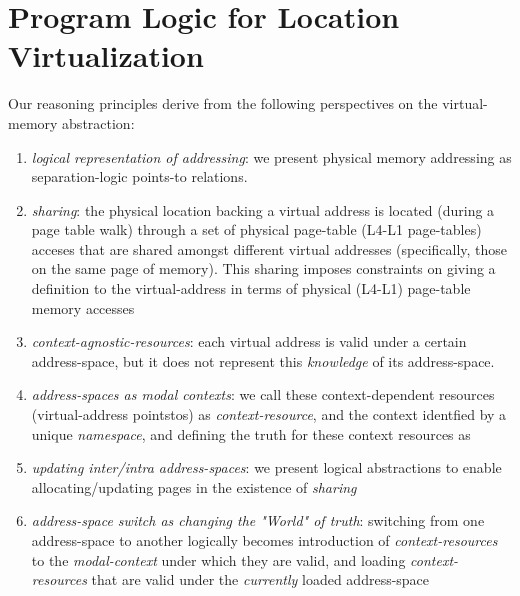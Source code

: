 \section{Program Logic for Location Virtualization}
\label{sec:logic}
\newcommand{\gammaPred}{\delta}
\newcommand{\gammaPreds}{\delta\textsf{s}}
\newcommand{\rtv}{\textsf{rtv}}
\newcommand{\qone}{\texttt{q1}}
\newcommand{\qtwo}{\texttt{q2}}
\newcommand{\qthree}{\texttt{q3}}
\newcommand{\qfour}{\texttt{q4}}

\newcommand{\sumwalkabs}[3]{
  \ownGhost\gammaPred{\authfrag{\singletonMap{#1}{(#2, #3)}}}
}

\newcommand{\sumapaces}[2]{
  \ownGhost\gammaPreds{\authfrag{\singletonMap{#1}{#2}}}
}
\newcommand{\ptableabswalk}[1]{\mathcal{A}\textsf{bsPTableWalk}(#1)}
\newcommand{\ptablestore}{\theta}
Our reasoning principles derive from the following perspectives on the virtual-memory abstraction:
\begin{enumerate}
\item \textit{logical representation of addressing}: we present physical memory addressing as separation-logic points-to relations.
\item \textit{sharing}: the physical location backing a virtual address is located (during a page table walk) through a 
      set of physical page-table (L4-L1 page-tables) acceses that are shared amongst different virtual addresses (specifically,
      those on the same page of memory). This sharing imposes constraints on giving a definition to the virtual-address 
      in terms of physical (L4-L1) page-table memory accesses
\item \textit{context-agnostic-resources}: each virtual address is valid under a certain address-space, but it does not represent this \textit{knowledge} of its address-space. 
\item \textit{address-spaces as modal contexts}: we call these context-dependent resources (virtual-address pointstos) as \textit{context-resource}, and the context identfied by a unique \textit{namespace}, and  defining the truth for these context resources as 
\item \textit{updating inter/intra address-spaces}: we present logical abstractions to enable allocating/updating pages in the existence of \textit{sharing}  
\item \textit{address-space switch as changing the "World" of truth}: switching from one address-space to another logically becomes introduction of \textit{context-resources} to the \textit{modal-context} under which they are valid, and loading \textit{context-resources} that are valid under the \textit{currently} loaded address-space
\end{enumerate}
